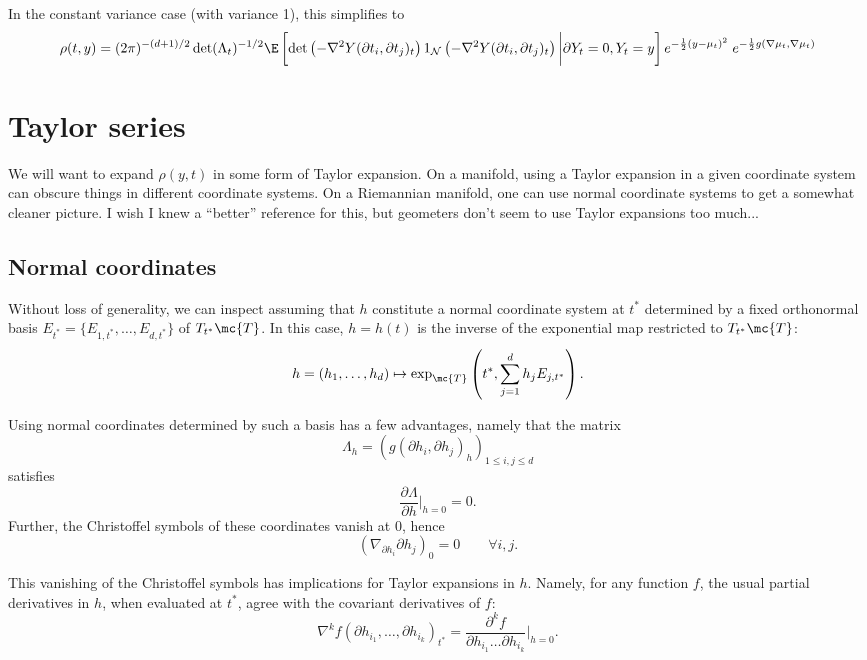 \documentclass{article}
\begin{document}
In the constant variance case (with variance 1), this simplifies to
$$
\begin{aligned}
\rho(t,y) = (2\pi)^{-(d+1)/2} \det(\Lambda_t)^{-1/2} \E \left[\det\left(-\nabla^2 Y(\partial t_i, \partial t_j)_t\right) 1_{{\cal N}}\left(-\nabla^2 Y(\partial t_i, \partial t_j)_t \right) \biggl \vert \partial Y_t=0, Y_t=y\right] e^{-\frac{1}{2}(y-\mu_t)^2} \; e^{-\frac{1}{2}g(\nabla \mu_t,\nabla \mu_t)}
\end{aligned}
$$

\section{Taylor series}

We will want to expand $\rho(y,t)$ in some form of Taylor expansion. On a manifold, using a Taylor expansion
in a given coordinate system can obscure things in different coordinate systems. On a Riemannian manifold,
one can use normal coordinate systems to get a somewhat cleaner picture. {\sc I wish I knew a ``better'' reference for this, but geometers don't seem to use Taylor expansions too much...}

\subsection{Normal coordinates}

Without loss of generality, we can inspect assuming that $h$ constitute a normal coordinate system at $t^*$ determined by a fixed orthonormal basis $E_{t^*} = \{E_{1,t^*}, \dots, E_{d,t^*}\}$ of $T_{t^*}\mc{T}$. In this case,
$h=h(t)$ is  the inverse of the exponential
map restricted to $T_{t^*} \mc{T}$:
$$
h = (h_1, \dots, h_d) \mapsto \exp_{\mc{T}}\left(t^*, \sum_{j=1}^d h_j E_{j,t^*} \right).
$$

Using normal coordinates determined by such a basis has a few advantages, namely that the matrix
$$
\Lambda_h = \left(g(\partial h_i, \partial h_j)_h \right)_{1 \leq i,j \leq d}
$$
satisfies
$$
\frac{\partial \Lambda}{\partial h} \biggl|_{h=0}=0.
$$
Further, the Christoffel symbols of these coordinates vanish at 0, hence
$$
(\nabla_{\partial h_i}\partial h_j)_0 = 0 \qquad \forall i,j.
$$

This vanishing of the Christoffel symbols has implications for Taylor expansions in $h$. Namely,
for any function $f$, the usual partial derivatives in $h$, when evaluated at $t^*$, agree with
the covariant derivatives of $f$:
$$
\nabla^k f(\partial h_{i_1}, \dots, \partial h_{i_k})_{t^*} = \frac{\partial^k f}{\partial h_{i_1} \dots \partial h_{i_k}} \biggl|_{h=0}.
$$
\end{document}

